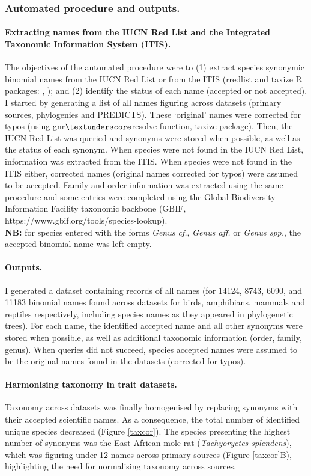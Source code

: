 \subsubsection{Automated procedure and outputs.}
\paragraph{Extracting names from the IUCN Red List and the Integrated Taxonomic Information System (ITIS).}
The objectives of the automated procedure were to (1) extract species synonymic binomial names from the IUCN Red List or from the ITIS (rredlist and taxize R packages: \citet{rredlist}, \citet{Chamberlain2013}); and (2) identify the status of each name (accepted or not accepted). I started by generating a list of all names figuring across datasets (primary sources, phylogenies and PREDICTS). These `original' names were corrected for typos (using gnr$\textunderscore$resolve function, taxize package). Then, the IUCN Red List was queried and synonyms were stored when possible, as well as the status of each synonym. When species were not found in the IUCN Red List, information was extracted from the ITIS. When species were not found in the ITIS either, corrected names (original names corrected for typos) were assumed to be accepted. Family and order information was extracted using the same procedure and some entries were completed using the Global Biodiversity Information Facility taxonomic backbone (GBIF, https://www.gbif.org/tools/species-lookup).\\
\textbf{NB:} for species entered with the forms \textit{Genus cf.}, \textit{Genus aff.} or \textit{Genus spp.}, the accepted binomial name was left empty.

\paragraph{Outputs.} I generated a dataset containing records of all names (for 14124, 8743, 6090, and 11183 binomial names found across datasets for birds, amphibians, mammals and reptiles respectively, including species names as they appeared in phylogenetic trees). For each name, the identified accepted name and all other synonyms were stored when possible, as well as additional taxonomic information (order, family, genus). When queries did not succeed, species accepted names were assumed to be the original names found in the datasets (corrected for typos).

\paragraph{Harmonising taxonomy in trait datasets.}
Taxonomy across datasets was finally homogenised by replacing synonyms with their accepted scientific names. As a consequence, the total number of identified unique species decreased (Figure \ref{taxcor}). The species presenting the highest number of synonyms was the East African mole rat (\textit{Tachyoryctes splendens}), which was figuring under 12 names across primary sources (Figure \ref{taxcor}B), highlighting the need for normalising taxonomy across sources.

